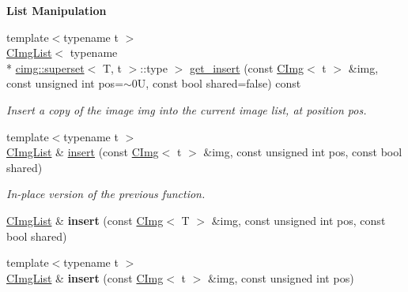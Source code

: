 \begin{Indent}{\bf List Manipulation}
\begin{DoxyCompactItemize}
\item 
\hypertarget{structcimg__library_1_1_c_img_list_af90e2e134e83a7eacd90079498602077}{{\footnotesize template$<$typename t $>$ }\\\hyperlink{structcimg__library_1_1_c_img_list}{C\-Img\-List}$<$ typename \\*
\hyperlink{structcimg__library_1_1cimg_1_1superset}{cimg\-::superset}$<$ T, t $>$\-::type $>$ \hyperlink{structcimg__library_1_1_c_img_list_af90e2e134e83a7eacd90079498602077}{get\-\_\-insert} (const \hyperlink{structcimg__library_1_1_c_img}{C\-Img}$<$ t $>$ \&img, const unsigned int pos=$\sim$0\-U, const bool shared=false) const }\label{structcimg__library_1_1_c_img_list_af90e2e134e83a7eacd90079498602077}

\begin{DoxyCompactList}\small\item\em Insert a copy of the image {\ttfamily img} into the current image list, at position {\ttfamily pos}. \end{DoxyCompactList}\item 
\hypertarget{structcimg__library_1_1_c_img_list_a969581eaaf8c96b7cc3b5e86f50a339e}{{\footnotesize template$<$typename t $>$ }\\\hyperlink{structcimg__library_1_1_c_img_list}{C\-Img\-List} \& \hyperlink{structcimg__library_1_1_c_img_list_a969581eaaf8c96b7cc3b5e86f50a339e}{insert} (const \hyperlink{structcimg__library_1_1_c_img}{C\-Img}$<$ t $>$ \&img, const unsigned int pos, const bool shared)}\label{structcimg__library_1_1_c_img_list_a969581eaaf8c96b7cc3b5e86f50a339e}

\begin{DoxyCompactList}\small\item\em In-\/place version of the previous function. \end{DoxyCompactList}\item 
\hypertarget{structcimg__library_1_1_c_img_list_a9cbb72cdb95f3da3e99c0551a334f3b6}{\hyperlink{structcimg__library_1_1_c_img_list}{C\-Img\-List} \& {\bfseries insert} (const \hyperlink{structcimg__library_1_1_c_img}{C\-Img}$<$ T $>$ \&img, const unsigned int pos, const bool shared)}\label{structcimg__library_1_1_c_img_list_a9cbb72cdb95f3da3e99c0551a334f3b6}

\item 
\hypertarget{structcimg__library_1_1_c_img_list_a9d3d2d5cf59096f466ce67c799a68244}{{\footnotesize template$<$typename t $>$ }\\\hyperlink{structcimg__library_1_1_c_img_list}{C\-Img\-List} \& {\bfseries insert} (const \hyperlink{structcimg__library_1_1_c_img}{C\-Img}$<$ t $>$ \&img, const unsigned int pos)}\label{structcimg__library_1_1_c_img_list_a9d3d2d5cf59096f466ce67c799a68244}


\end{DoxyCompactItemize}
\end{Indent}
